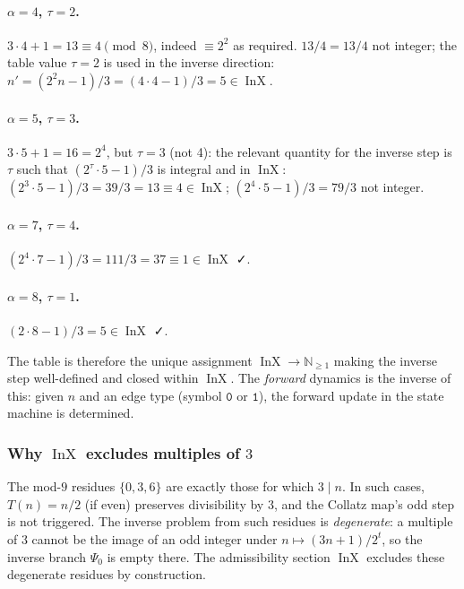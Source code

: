 \documentclass[11pt,a4paper]{article}
\theoremstyle{plain}
\theoremstyle{definition}
\newcommand{\NN}{\mathbb{N}}
\DeclareMathOperator{\InX}{InX}
\begin{document}
\paragraph{$\alpha = 4$, $\tau = 2$.}
$3 \cdot 4 + 1 = 13 \equiv 4 \pmod 8$, indeed $\equiv 2^2$ as
required. $13 / 4 = 13/4$ not integer; the table value $\tau = 2$
is used in the inverse direction: $n' = (2^2 n - 1)/3 = (4 \cdot 4 - 1)/3 = 5 \in \InX$.

\paragraph{$\alpha = 5$, $\tau = 3$.}
$3 \cdot 5 + 1 = 16 = 2^4$, but $\tau = 3$ (not 4): the relevant
quantity for the inverse step is $\tau$ such that $(2^\tau \cdot 5 - 1)/3$
is integral and in $\InX$: $(2^3 \cdot 5 - 1)/3 = 39/3 = 13 \equiv 4 \in \InX$;
$(2^4 \cdot 5 - 1)/3 = 79/3$ not integer.

\paragraph{$\alpha = 7$, $\tau = 4$.}
$(2^4 \cdot 7 - 1)/3 = 111/3 = 37 \equiv 1 \in \InX$ ✓.

\paragraph{$\alpha = 8$, $\tau = 1$.}
$(2 \cdot 8 - 1)/3 = 5 \in \InX$ ✓.

The table is therefore the unique assignment $\InX \to \NN_{\ge 1}$
making the inverse step well-defined and closed within $\InX$. The
\emph{forward} dynamics is the inverse of this: given $n$ and an
edge type (symbol $\mathtt{0}$ or $\mathtt{1}$), the forward update
in the state machine is determined.

\subsubsection*{Why $\InX$ excludes multiples of $3$}

The mod-$9$ residues $\{0, 3, 6\}$ are exactly those for which
$3 \mid n$. In such cases, $T(n) = n/2$ (if even) preserves
divisibility by $3$, and the Collatz map's odd step is not
triggered. The inverse problem from such residues is
\emph{degenerate}: a multiple of $3$ cannot be the image of an odd
integer under $n \mapsto (3n+1)/2^t$, so the inverse branch
$\Psi_0$ is empty there. The admissibility section $\InX$ excludes
these degenerate residues by construction.
\end{document}
